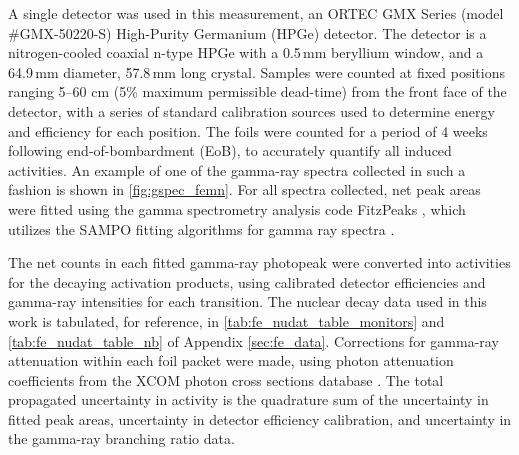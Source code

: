 A single detector was used in this measurement, an ORTEC GMX Series (model \#GMX-50220-S)  High-Purity Germanium (HPGe) detector.
The detector is a nitrogen-cooled coaxial n-type HPGe with a 0.5\,mm beryllium window, and a 64.9\,mm diameter, 57.8\,mm long crystal.
Samples were counted at fixed positions ranging 5--60  cm (5\% maximum permissible dead-time) from the front face of the detector, with a series of standard calibration sources used to determine energy and efficiency for each position.
The foils were counted  for a period of 4 weeks following end-of-bombardment (EoB), to accurately quantify all induced activities.
An example of one of the gamma-ray spectra collected in such a fashion is shown in \autoref{fig:gspec_femn}.
For all spectra collected, net peak areas were fitted using the gamma spectrometry analysis code FitzPeaks \cite{fitzgerald2009fitzpeaks}, which utilizes the SAMPO fitting algorithms for gamma ray spectra \cite{Aarnio2001}.



The net  counts in each fitted gamma-ray photopeak were converted into  activities for the decaying  activation products, using calibrated detector efficiencies and gamma-ray intensities for each transition.
The nuclear decay data used in this work is tabulated, for reference, in \autoref{tab:fe_nudat_table_monitors} and \autoref{tab:fe_nudat_table_nb} of Appendix \ref{sec:fe_data}.
Corrections for gamma-ray attenuation within each foil packet were made, using  photon attenuation coefficients from the XCOM photon cross sections database  \cite{berger2011xcom}.
The total propagated uncertainty in  activity is the quadrature sum of the uncertainty in  fitted peak areas, uncertainty in detector efficiency calibration, and uncertainty in the gamma-ray branching ratio data.




